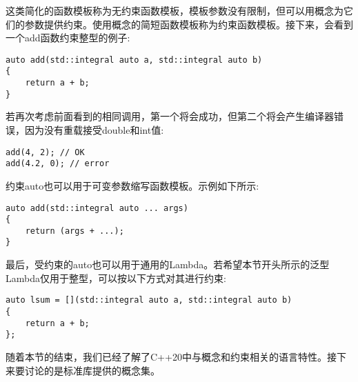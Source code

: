 这类简化的函数模板称为无约束函数模板，模板参数没有限制，但可以用概念为它们的参数提供约束。使用概念的简短函数模板称为约束函数模板。接下来，会看到一个add函数约束整型的例子:

\begin{lstlisting}[style=styleCXX]
auto add(std::integral auto a, std::integral auto b)
{
	return a + b;
}
\end{lstlisting}

若再次考虑前面看到的相同调用，第一个将会成功，但第二个将会产生编译器错误，因为没有重载接受double和int值:

\begin{lstlisting}[style=styleCXX]
add(4, 2); // OK
add(4.2, 0); // error
\end{lstlisting}

约束auto也可以用于可变参数缩写函数模板。示例如下所示:

\begin{lstlisting}[style=styleCXX]
auto add(std::integral auto ... args)
{
	return (args + ...);
}
\end{lstlisting}

最后，受约束的auto也可以用于通用的Lambda。若希望本节开头所示的泛型Lambda仅用于整型，可以按以下方式对其进行约束:

\begin{lstlisting}[style=styleCXX]
auto lsum = [](std::integral auto a, std::integral auto b)
{
	return a + b;
};
\end{lstlisting}

随着本节的结束，我们已经了解了C++20中与概念和约束相关的语言特性。接下来要讨论的是标准库提供的概念集。






























